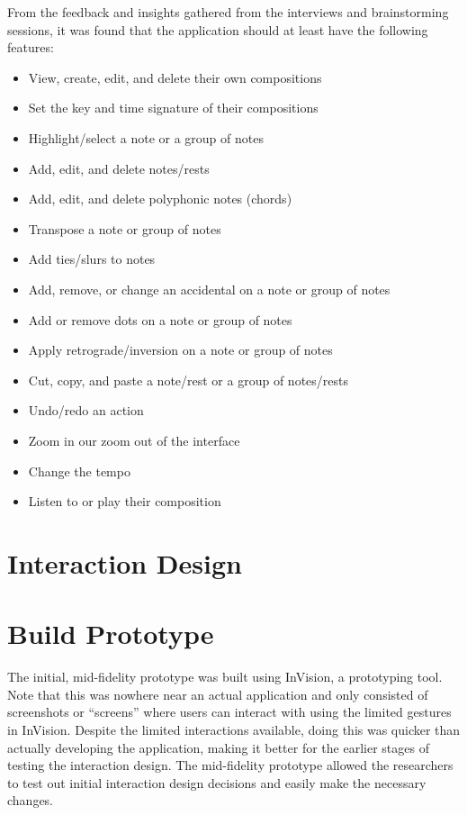			From the feedback and insights gathered from the interviews and brainstorming sessions, it was found that the application should at least have the following features: 
			\begin{itemize}
    			\item View, create, edit, and delete their own compositions
    			\item Set the key and time signature of their compositions
    			\item Highlight/select a note or a group of notes
             	\item Add, edit, and delete notes/rests 
              	\item Add, edit, and delete polyphonic notes (chords)
           		\item Transpose a note or group of notes
        		\item Add ties/slurs to notes
              	\item Add, remove, or change an accidental on a note or group of notes
              	\item Add or remove dots on a note or group of notes
              	\item Apply retrograde/inversion on a note or group of notes
              	\item Cut, copy, and paste a note/rest or a group of notes/rests
              	\item Undo/redo an action
              	\item Zoom in our zoom out of the interface
              	\item Change the tempo
              	\item Listen to or play their composition
          	\end{itemize}				

	\section{Interaction Design}





	\section{Build Prototype}

		The initial, mid-fidelity prototype was built using InVision, a prototyping tool. Note that this was nowhere near an actual application and only consisted of screenshots or ``screens'' where users can interact with using the limited gestures in InVision. Despite the limited interactions available, doing this was quicker than actually developing the application, making it better for the earlier stages of testing the interaction design. The mid-fidelity prototype allowed the researchers to test out initial interaction design decisions and easily make the necessary changes. 

